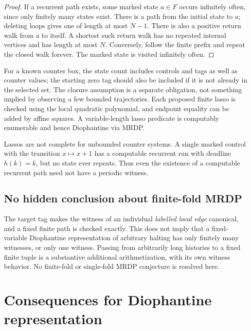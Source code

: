 \documentclass[11pt,letterpaper]{article}
\theoremstyle{definition}
\theoremstyle{remark}
\newcommand{\1}{\mathbf 1}
\newcommand{\srctag}[1]{\texorpdfstring{\hspace{0.4em}{\normalfont\small\color{accent}[source #1]}}{ [source #1]}}
\begin{document}
\begin{proof}
If a recurrent path exists, some marked state $a\in F$ occurs infinitely
often, since only finitely many states exist. There is a path from the
initial state to $a$; deleting loops gives one of length at most $N-1$.
There is also a positive return walk from $a$ to itself. A shortest such
return walk has no repeated internal vertices and has length at most $N$.
Conversely, follow the finite prefix and repeat the closed walk forever.
The marked state is visited infinitely often.
\end{proof}

For a known counter box, the state count includes controls and tags as well
as counter values; the starting zero tag should also be included if it is
not already in the selected set. The closure assumption is a separate
obligation, not something implied by observing a few bounded trajectories.
Each proposed finite lasso is checked using the local quadratic polynomial,
and endpoint equality can be added by affine squares. A variable-length
lasso predicate is computably enumerable and hence Diophantine via MRDP.

Lassos are not complete for unbounded counter systems. A single marked
control with the transition $x\mapsto x+1$ has a computable recurrent run
with deadline $h(k)=k$, but no state ever repeats. Thus even the existence
of a computable recurrent path need not have a periodic witness.

\subsection{No hidden conclusion about finite-fold MRDP}

The target tag makes the witness of an individual \emph{labelled local edge}
canonical, and a fixed finite path is checked exactly. This does not imply
that a fixed-variable Diophantine representation of arbitrary halting has
only finitely many witnesses, or only one witness. Passing from arbitrarily
long histories to a fixed finite tuple is a substantive additional
arithmetization, with its own witness behavior. No finite-fold or
single-fold MRDP conjecture is resolved here.
\section{Consequences for Diophantine representation\srctag{11}}\label{lbh:ql:sec:barriers}
\end{document}
